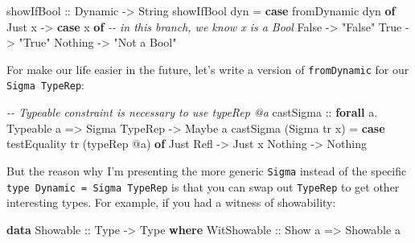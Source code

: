 \documentclass[]{article}
\newenvironment{Shaded}{}{}
\newcommand{\CommentTok}[1]{\textcolor[rgb]{0.38,0.63,0.69}{\textit{#1}}}
\newcommand{\DataTypeTok}[1]{\textcolor[rgb]{0.56,0.13,0.00}{#1}}
\newcommand{\KeywordTok}[1]{\textcolor[rgb]{0.00,0.44,0.13}{\textbf{#1}}}
\newcommand{\NormalTok}[1]{#1}
\newcommand{\OperatorTok}[1]{\textcolor[rgb]{0.40,0.40,0.40}{#1}}
\newcommand{\OtherTok}[1]{\textcolor[rgb]{0.00,0.44,0.13}{#1}}
\newcommand{\StringTok}[1]{\textcolor[rgb]{0.25,0.44,0.63}{#1}}
\begin{document}
\begin{Shaded}
\begin{Highlighting}[]
\OtherTok{showIfBool ::} \DataTypeTok{Dynamic} \OtherTok{{-}\textgreater{}} \DataTypeTok{String}
\NormalTok{showIfBool dyn }\OtherTok{=} \KeywordTok{case}\NormalTok{ fromDynamic dyn }\KeywordTok{of}
    \DataTypeTok{Just}\NormalTok{ x }\OtherTok{{-}\textgreater{}} \KeywordTok{case}\NormalTok{ x }\KeywordTok{of}      \CommentTok{{-}{-} in this branch, we know x is a Bool}
      \DataTypeTok{False} \OtherTok{{-}\textgreater{}} \StringTok{"False"}
      \DataTypeTok{True}  \OtherTok{{-}\textgreater{}} \StringTok{"True"}
    \DataTypeTok{Nothing} \OtherTok{{-}\textgreater{}} \StringTok{"Not a Bool"}
\end{Highlighting}
\end{Shaded}

For make our life easier in the future, let's write a version of
\texttt{fromDynamic} for our \texttt{Sigma\ TypeRep}:

\begin{Shaded}
\begin{Highlighting}[]
\CommentTok{{-}{-} Typeable constraint is necessary to use typeRep @a}
\OtherTok{castSigma ::} \KeywordTok{forall}\NormalTok{ a}\OperatorTok{.} \DataTypeTok{Typeable}\NormalTok{ a }\OtherTok{=\textgreater{}} \DataTypeTok{Sigma} \DataTypeTok{TypeRep} \OtherTok{{-}\textgreater{}} \DataTypeTok{Maybe}\NormalTok{ a}
\NormalTok{castSigma (}\DataTypeTok{Sigma}\NormalTok{ tr x) }\OtherTok{=} \KeywordTok{case}\NormalTok{ testEquality tr (typeRep }\OperatorTok{@}\NormalTok{a) }\KeywordTok{of}
    \DataTypeTok{Just} \DataTypeTok{Refl} \OtherTok{{-}\textgreater{}} \DataTypeTok{Just}\NormalTok{ x}
    \DataTypeTok{Nothing}   \OtherTok{{-}\textgreater{}} \DataTypeTok{Nothing}
\end{Highlighting}
\end{Shaded}

But the reason why I'm presenting the more generic \texttt{Sigma} instead of the
specific \texttt{type\ Dynamic\ =\ Sigma\ TypeRep} is that you can swap out
\texttt{TypeRep} to get other interesting types. For example, if you had a
witness of showability:

\begin{Shaded}
\begin{Highlighting}[]
\KeywordTok{data} \DataTypeTok{Showable}\OtherTok{ ::} \DataTypeTok{Type} \OtherTok{{-}\textgreater{}} \DataTypeTok{Type} \KeywordTok{where}
    \DataTypeTok{WitShowable}\OtherTok{ ::} \DataTypeTok{Show}\NormalTok{ a }\OtherTok{=\textgreater{}} \DataTypeTok{Showable}\NormalTok{ a}
\end{Highlighting}
\end{Shaded}
\end{document}
